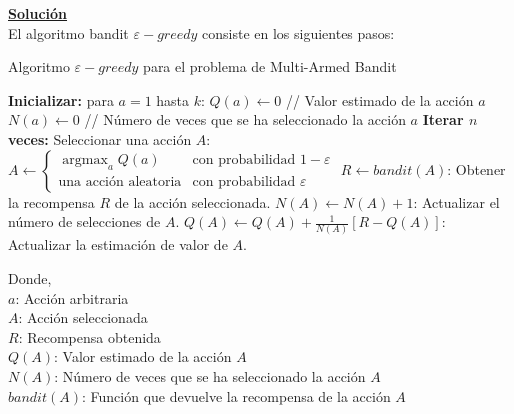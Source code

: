 \documentclass[12pt]{article}
\newlength\tindent
\renewcommand{\indent}{\hspace*{\tindent}}
\DeclareMathOperator*{\argmax}{argmax}
\begin{document}
    \indent\underline{\textbf{Solución}}\\
    El algoritmo bandit $\varepsilon-greedy$ consiste en los siguientes pasos\footnotemark:

    \begin{algorithm}[H]
        \caption{Algoritmo $\varepsilon-greedy$ para el problema de Multi-Armed Bandit}
        \begin{algorithmic}[1]
            \State \textbf{Inicializar:} para $a = 1$ hasta $k$:
            \State \quad $Q(a) \leftarrow 0$ \quad // Valor estimado de la acción $a$
            \State \quad $N(a) \leftarrow 0$ \quad // Número de veces que se ha seleccionado la acción $a$
            \State \textbf{Iterar $n$ veces:}
            \State \quad Seleccionar una acción $A$:
            \State \quad \quad $A \leftarrow
            \begin{cases}
                \argmax_{a} Q(a) & \text{con probabilidad } 1 - \varepsilon \\
                \text{una acción aleatoria} & \text{con probabilidad } \varepsilon
            \end{cases}$
            \State \quad $R \leftarrow bandit(A)$: Obtener la recompensa $R$ de la acción seleccionada.
            \State \quad $N(A) \leftarrow N(A) + 1$: Actualizar el número de selecciones de $A$.
            \State \quad $Q(A) \leftarrow Q(A) + \frac{1}{N(A)} [R - Q(A)]$: Actualizar la estimación de valor de $A$.
        \end{algorithmic}\label{alg:epsilon_greedy}
    \end{algorithm}

    Donde,\\
    $a$: Acción arbitraria \\
    $A$: Acción seleccionada \\
    $R$: Recompensa obtenida \\
    $Q(A)$: Valor estimado de la acción $A$ \\
    $N(A)$: Número de veces que se ha seleccionado la acción $A$ \\
    $bandit(A)$: Función que devuelve la recompensa de la acción $A$ \\
\end{document}
